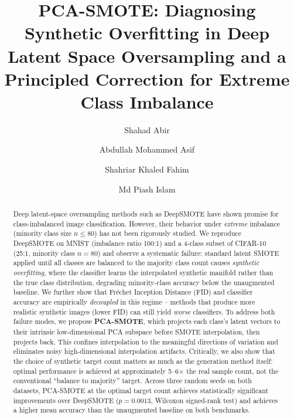 \documentclass[5p,times]{elsarticle}
\begin{document}
\sloppy

\linenumbers

\begin{frontmatter}

\title{PCA-SMOTE: Diagnosing Synthetic Overfitting in Deep Latent Space
       Oversampling and a Principled Correction for Extreme Class Imbalance}


\author[1]{Shahad Abir}

\author[1]{Abdullah Mohammed Asif}

\author[1]{Shahriar Khaled Fahim}

\author[1]{Md Piash Islam}


\begin{abstract}
Deep latent-space oversampling methods such as DeepSMOTE have shown promise
for class-imbalanced image classification.
However, their behavior under \emph{extreme} imbalance (minority class size
$n \leq 80$) has not been rigorously studied.
We reproduce DeepSMOTE on MNIST (imbalance ratio 100:1) and a 4-class
subset of CIFAR-10 (25:1, minority class \( n = 80 \)) and observe a systematic failure:
standard latent SMOTE applied until all classes are balanced to the majority
class count causes \emph{synthetic overfitting}, where the classifier learns the
interpolated synthetic manifold rather than the true class distribution,
degrading minority-class accuracy below the unaugmented baseline.
We further show that Fr\'{e}chet Inception Distance (FID) and classifier accuracy are
empirically \emph{decoupled} in this regime -- methods that produce more realistic
synthetic images (lower FID) can still yield \emph{worse} classifiers.
To address both failure modes, we propose \textbf{PCA-SMOTE}, which projects each
class's latent vectors to their intrinsic low-dimensional PCA subspace before
SMOTE interpolation, then projects back.
This confines interpolation to the meaningful directions of variation and
eliminates noisy high-dimensional interpolation artifacts.
Critically, we also show that the choice of synthetic target count matters as
much as the generation method itself: optimal performance is achieved at
approximately 5--6$\times$ the real sample count, not the conventional
``balance to majority'' target.
Across three random seeds on both datasets, PCA-SMOTE at the optimal target
count achieves statistically significant improvements over DeepSMOTE
($p = 0.0013$, Wilcoxon signed-rank test) and achieves a higher mean
accuracy than the unaugmented baseline on both benchmarks.
\end{abstract}


\end{frontmatter}
\end{document}
